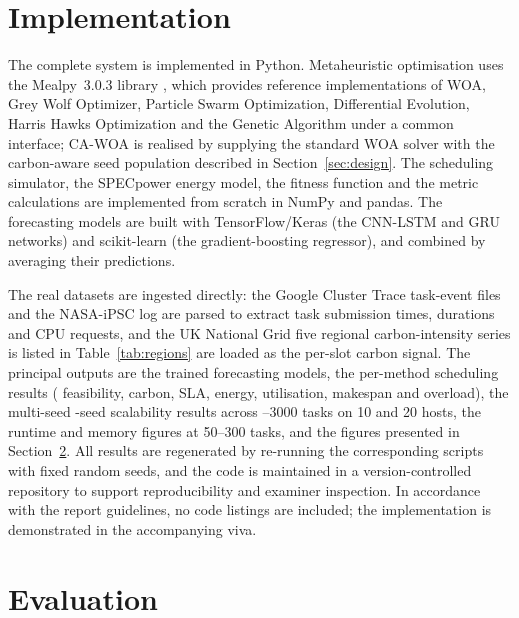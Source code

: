 \documentclass[12pt,a4paper]{article}
\providecommand{\DIFaddtex}[1]{{\protect\color{blue} \sf #1}} %
\providecommand{\DIFdeltex}[1]{{\protect\color{red} \scriptsize #1}} %
\providecommand{\DIFaddbegin}{} %
\providecommand{\DIFaddend}{} %
\providecommand{\DIFdelbegin}{} %
\providecommand{\DIFdelend}{} %
\providecommand{\DIFadd}[1]{\texorpdfstring{\DIFaddtex{#1}}{#1}} %
\providecommand{\DIFdel}[1]{\texorpdfstring{\DIFdeltex{#1}}{}} %
\providecommand{\DIFscaledelfig}{0.5}
\newlength{\DIFdelgraphicswidth} %
\newlength{\DIFdelgraphicsheight} %
\providecommand{\DIFaddincludegraphics}[2][]{{\color{blue}\fbox{\DIFOincludegraphics[#1]{#2}}}} %
\providecommand{\DIFdelincludegraphics}[2][]{%
\sbox{\DIFdelgraphicsbox}{\DIFOincludegraphics[#1]{#2}}%
\settoboxwidth{\DIFdelgraphicswidth}{\DIFdelgraphicsbox} %
\settoboxtotalheight{\DIFdelgraphicsheight}{\DIFdelgraphicsbox} %
\scalebox{\DIFscaledelfig}{%
\parbox[b]{\DIFdelgraphicswidth}{\usebox{\DIFdelgraphicsbox}\\[-\baselineskip] \rule{\DIFdelgraphicswidth}{0em}}\llap{\resizebox{\DIFdelgraphicswidth}{\DIFdelgraphicsheight}{%
\setlength{\unitlength}{\DIFdelgraphicswidth}%
\begin{picture}(1,1)%
\thicklines\linethickness{2pt} %
{\color[rgb]{1,0,0}\put(0,0){\framebox(1,1){}}}%
{\color[rgb]{1,0,0}\put(0,0){\line( 1,1){1}}}%
{\color[rgb]{1,0,0}\put(0,1){\line(1,-1){1}}}%
\end{picture}%
}\hspace*{3pt}}} %
} %
\DeclareRobustCommand{\DIFaddbegin}{\DIFOaddbegin \let\includegraphics\DIFaddincludegraphics} %
\DeclareRobustCommand{\DIFaddend}{\DIFOaddend \let\includegraphics\DIFOincludegraphics} %
\DeclareRobustCommand{\DIFdelbegin}{\DIFOdelbegin \let\includegraphics\DIFdelincludegraphics} %
\DeclareRobustCommand{\DIFdelend}{\DIFOaddend \let\includegraphics\DIFOincludegraphics} %
\begin{document}
\section{Implementation}\label{sec:impl}
The complete system is implemented in Python. Metaheuristic optimisation uses the Mealpy~3.0.3 library
\cite{vanthieu2023mealpy}, which provides reference implementations of WOA, Grey Wolf Optimizer, Particle Swarm
Optimization, Differential Evolution, Harris Hawks Optimization and the Genetic Algorithm under a common
interface; CA-WOA is realised by supplying the standard WOA solver with the carbon-aware seed population
described in Section~\ref{sec:design}. The scheduling simulator, the SPECpower energy model, the fitness
function and the metric calculations are implemented from scratch in NumPy and pandas. The forecasting models
are built with TensorFlow/Keras (the CNN-LSTM and GRU networks) and scikit-learn (the gradient-boosting
regressor), and combined by averaging their predictions.

The real datasets are ingested directly: the Google Cluster Trace task-event files \DIFaddbegin \DIFadd{and the NASA-iPSC log }\DIFaddend are
parsed to extract task submission times, durations and CPU requests, and the \DIFdelbegin \DIFdel{UK National Grid }\DIFdelend \DIFaddbegin \DIFadd{five regional }\DIFaddend carbon-intensity
series \DIFdelbegin \DIFdel{is }\DIFdelend \DIFaddbegin \DIFadd{listed in Table~\ref{tab:regions} are }\DIFaddend loaded as the per-slot carbon signal. The principal outputs are
the trained forecasting models, the per-method scheduling results (\DIFaddbegin \DIFadd{feasibility, }\DIFaddend carbon, SLA, energy,
utilisation, makespan and overload), the \DIFdelbegin \DIFdel{multi-seed }\DIFdelend \DIFaddbegin \DIFadd{30-seed }\DIFaddend scalability results across \DIFaddbegin \DIFadd{500--3000 tasks on 10 and 20
hosts, the runtime and memory figures at }\DIFaddend 50--300 tasks, and the figures presented in
Section~\ref{sec:eval}. All results are regenerated by re-running
the corresponding scripts with fixed random seeds, and the code is maintained in a version-controlled
repository to support reproducibility and examiner inspection. In accordance with the report guidelines, no
code listings are included; the implementation is demonstrated in the accompanying viva.

\section{Evaluation}\label{sec:eval}
\end{document}
